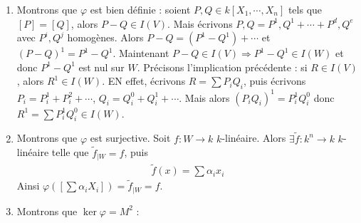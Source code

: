             \begin{enumerate}
                \item Montrons que $\varphi$ est bien définie : soient $P,Q \in k[X_1, \cdots, X_n]$ tels que $[P] = [Q]$, alors $P - Q \in I(V)$. Mais écrivons $P,Q = P^1,Q^1 + \cdots + P^d,Q^e$ avec $P^i,Q^j$ homogènes. Alors $P-Q = (P^1 - Q^1) + \cdots$ et $(P - Q)^1 = P^1 - Q^1$. Maintenant $P - Q \in I(V) \Rightarrow P^1 - Q^1 \in I(W)$ et donc $P^1 - Q^1$ est nul sur $W$. Précisons l'implication précédente : si $R \in I(V)$, alors $R^1 \in I(W)$. EN effet, écrivons $R = \sum P_iQ_i$, puis écrivons $P_i = P_i^1 + P_i^2 + \cdots$, $Q_i = Q_i^0 + Q_i^1 + \cdots$. Mais alors $(P_iQ_i)^1 = P_i^1Q_i^0$ donc $R^1 = \sum P_i^1Q_i^0 \in I(W)$.
                \item Montrons que $\varphi$ est surjective. Soit $f : W \to k$ $k$-linéaire. Alors $\exists \tilde f : k^n \to k$ $k$-linéaire telle que $\tilde f_{|W} = f$, puis 
                \begin{align*}
                    \tilde f(x) = \sum \alpha_i x_i
                \end{align*}
                Ainsi $\varphi([\sum \alpha_i X_i]) = \tilde f_{|W} = f$.
                \item Montrons que $\ker \varphi = M^2$ :    
            \end{enumerate}

